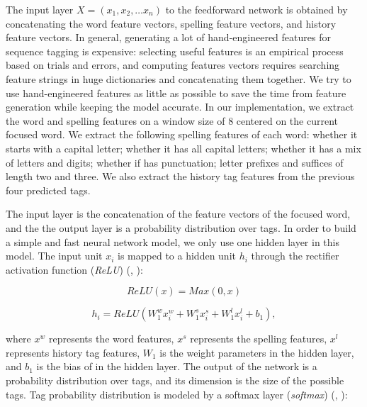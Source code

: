 The input layer $X=\left( x_{1},x_{2},\ldots x_{n}\right)$ to the feedforward network is obtained by concatenating the word feature vectors, spelling feature vectors, and history feature vectors. In general, generating a lot of hand-engineered features for sequence tagging is expensive: selecting useful features is an empirical process based on trials and errors, and computing features vectors requires searching feature strings in huge dictionaries and concatenating them together. We try to use hand-engineered features as little as possible to save the time from feature generation while keeping the model accurate. In our implementation, we extract the word and spelling features on a window size of 8 centered on the current focused word. We extract the following spelling features of each word: whether it starts with a capital letter; whether it has all capital letters; whether it has a mix of letters and digits; whether if has punctuation; letter prefixes and suffices of length two and three. We also extract the history tag features from the previous four predicted tags. 

The input layer is the concatenation of the feature vectors of the focused word, and the the output layer is a probability distribution over tags. In order to build a simple and fast neural network model, we only use one hidden layer in this model. The input unit $x_{i}$ is mapped to a hidden unit $h_{i}$ through the rectifier activation function (\textit{ReLU}) (\citeauthor{nair2010rectified}, \citeyear{nair2010rectified}):

\begin{equation}
\textit{ReLU}\left(x\right) = \textit{Max}\left(0,x\right)
\end{equation}

\begin{equation}
h_{i}=\textit{ReLU}\left( W_{1}^{w}x_{i}^{w}+W_{1}^{s}x_{i}^{s}+W_{1}^{l}x_{i}^{l}+b_{1}\right),
\end{equation}

where $x^{w}$ represents the word features, $x^{s}$ represents the spelling features, $x^{l}$ represents history tag features, $W_{1}$ is the weight parameters in the hidden layer, and $b_{1}$ is the bias of in the hidden layer. The output of the network is a probability distribution over tags, and its dimension is the size of the possible tags. Tag probability distribution is modeled by a softmax layer (\textit{softmax}) (\citeauthor{dugas2001incorporating}, \citeyear{dugas2001incorporating}):

